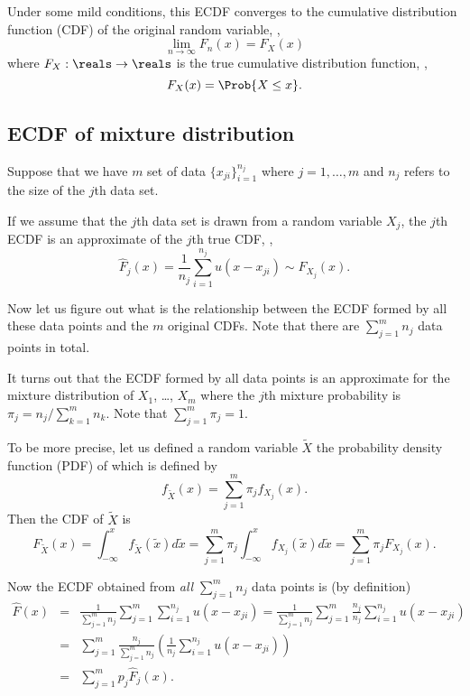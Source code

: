 Under some mild conditions, this ECDF converges to the cumulative distribution function (CDF) of the original random variable,
\ie,
\begin{equation}
\lim_{n\to\infty} F_n(x) = F_X(x)
\end{equation}
where $F_X:\reals\to\reals$ is the true cumulative distribution function,
\ie,
\begin{equation}
F_X(x) = \Prob\{X\leq x\}.
\end{equation}

\subsection{ECDF of mixture distribution}

Suppose that we have $m$ set of data $\{x_{ji}\}_{i=1}^{n_j}$
where $j=1,\ldots, m$ and $n_j$ refers to the size of the $j$th data set.

If we assume that the $j$th data set is drawn from a random variable $X_j$,
the $j$th ECDF is an approximate of the $j$th true CDF,
\ie,
\begin{equation}
\hat{F}_j(x) = \frac{1}{n_j} \sum_{i=1}^{n_j} u(x-x_{ji})
\sim F_{X_j}(x).
\end{equation}

Now let us figure out what is the relationship between the ECDF formed by all these data points
and the $m$ original CDFs.
Note that there are $\sum_{j=1}^m n_j$ data points in total.

It turns out that the ECDF formed by all data points is an approximate for the mixture distribution
of $X_1$, \ldots, $X_m$
where the $j$th mixture probability is $\pi_j = n_j / \sum_{k=1}^m n_k$.
Note that $\sum_{j=1}^m \pi_j = 1$.

To be more precise, let us defined a random variable $\tilde{X}$
the probability density function (PDF) of which is defined by
\begin{equation}
\label{eq:gyusj}
f_{\tilde{X}}(x) = \sum_{j=1}^m \pi_j f_{X_j}(x).
\end{equation}
Then the CDF of $\tilde{X}$ is
\begin{equation}
F_{\tilde{X}}(x)
= \int_{-\infty}^x f_{\tilde{X}}(\tilde{x}) d\tilde{x}
= \sum_{j=1}^m \pi_j \int_{-\infty}^x f_{X_j}(\tilde{x}) d\tilde{x}
= \sum_{j=1}^m \pi_j F_{X_j}(x).
\end{equation}

Now the ECDF obtained from \emph{all} $\sum_{j=1}^m n_j$ data points is (by definition)
\begin{eqnarray*}
\hat{F}(x) &=& \frac{1}{\sum_{j=1}^m n_j} \sum_{j=1}^m \sum_{i=1}^{n_j} u(x-x_{ji})
= \frac{1}{\sum_{j=1}^m n_j} \sum_{j=1}^m \frac{n_j}{n_j} \sum_{i=1}^{n_j} u(x-x_{ji})
\\
&=&
\sum_{j=1}^m \frac{n_j}{\sum_{j=1}^m n_j} \left( \frac{1}{n_j} \sum_{i=1}^{n_j} u(x-x_{ji}) \right)
\\
&=&
\sum_{j=1}^m p_j \hat{F}_j(x).
\end{eqnarray*}

